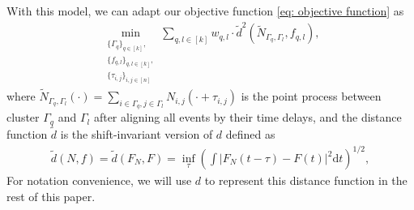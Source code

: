 With this model, we can adapt our objective function \eqref{eq: objective function} as
\begin{align}
	\min_{\substack{\{\Gamma_q\}_{q\in[k]},\\ \{f_{q,l}\}_{q,l\in[k]},\\ \{\tau_{i,j}\}_{i,j\in[n]}}} 
	\sum_{q,l\in[k]}
	w_{q,l}\cdot
	\tilde d^2(\tilde N_{\Gamma_q, \Gamma_l}, f_{q,l}),
	\label{eq: objective function 2}
\end{align}
where $\tilde N_{\Gamma_q, \Gamma_l}(\cdot)=\sum_{i\in\Gamma_q,j\in\Gamma_l}N_{i,j}(\cdot+\tau_{i,j})$ is the point process between cluster $\Gamma_q$ and $\Gamma_l$ after aligning all events by their time delays, and the distance function $\tilde d$ is the shift-invariant version of $d$ defined as
\begin{align*}
\tilde d(N, f) = \tilde d(F_N, F) = \inf_{\tau} \left( \int |F_N(t-\tau) - F(t)|^2 \text{d}t \right) ^{1/2},
\end{align*}
For notation convenience, we will use $d$ to represent this distance function in the rest of this paper.












